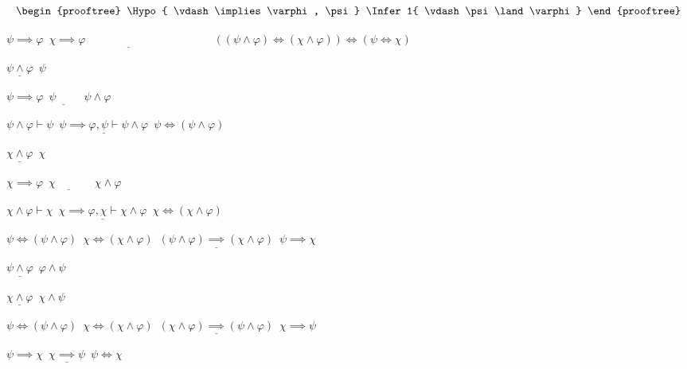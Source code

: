 
\[
  \begin{prooftree}
    \Hypo{ \vdash \implies \varphi, \psi }
    \Infer1{ \vdash \psi \land \varphi }
  \end{prooftree}
\]

$\psi \implies \varphi$\
$\underline{\chi \implies \varphi \quad\quad\quad\quad\quad\quad\quad\quad\quad\quad\quad}$\
$((\psi \land \varphi) \iff (\chi \land \varphi)) \iff (\psi \iff \chi)$


$\underline{\psi \land \varphi}$\
$\psi$

$\psi \implies \varphi$\
$\underline{\psi\quad\quad}$\
$\psi \land \varphi$

$\psi \land \varphi \vdash \psi$\
$\underline{\psi \implies \varphi, \psi \vdash \psi \land \varphi}$\
$\psi \iff (\psi \land \varphi)$


$\underline{\chi \land \varphi}$\
$\chi$

$\chi \implies \varphi$\
$\underline{\chi\quad\quad\quad}$\
$\chi \land \varphi$

$\chi \land \varphi \vdash \chi$\
$\underline{\chi \implies \varphi, \chi \vdash \chi \land \varphi}$\
$\chi \iff (\chi \land \varphi)$


$\psi \iff (\psi \land \varphi)$\
$\chi \iff (\chi \land \varphi)$\
$\underline{(\psi \land \varphi) \implies (\chi \land \varphi)}$\
$\psi \implies \chi$


$\underline{\psi \land \varphi}$\
$\varphi \land \psi$

$\underline{\chi \land \varphi}$\
$\chi \land \psi$

$\psi \iff (\psi \land \varphi)$\
$\chi \iff (\chi \land \varphi)$\
$\underline{(\chi \land \varphi) \implies (\psi \land \varphi)}$\
$\chi \implies \psi$


$\psi \implies \chi$\
$\underline{\chi \implies \psi}$\
$\psi \iff \chi$